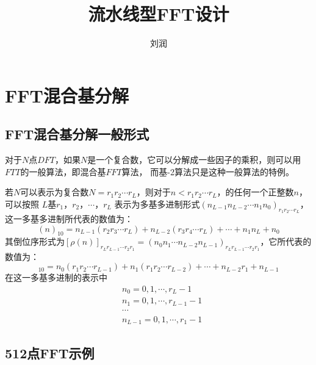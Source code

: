 \documentclass[11pt,a4paper]{article}
\title{流水线型FFT设计}
\author{刘润}
\begin{document}
\maketitle
\section{FFT混合基分解}

\subsection{FFT混合基分解一般形式}
对于$N$点$DFT$，如果$N$是一个复合数，它可以分解成一些因子的乘积，则可以用$FTT$的一般算法，即混合基$FFT$算法，
而基-2算法只是这种一般算法的特例。

若$N$可以表示为复合数$N=r_1r_2 \cdots r_L$，则对于$n<r_1r_2 \cdots r_L$，的任何一个正整数$n$，可以按照
$L$基$r_1$，$r_2$，$\cdots$，$r_L$ 表示为多基多进制形式$(n_{L-1}n_{L-2} \cdots n_1n_0)_{r_1r_2 \cdots r_L}$，
这一多基多进制所代表的数值为：
\begin{equation}
    (n)_{10} = n_{L-1}(r_2r_3 \cdots r_L) + n_{L-2}(r_3r_4 \cdots r_L) + \cdots + n_1n_L + n_0
\end{equation}
其倒位序形式为$[\rho(n)]_{r_Lr_{L-1} \cdots r_2r_1} = (n_0n_1 \cdots n_{L-2}n_{L-1})_{r_Lr_{L-1} \cdots r_2r_1}$，它所代表的数值为：
\begin{equation}
    [\rho(n)]_{10}=n_0(r_1r_2 \cdots r_{L-1}) + n_1(r_1r_2 \cdots r_{L-2}) + \cdots + n_{L-2}r_1 + n_{L-1}
\end{equation}
在这一多基多进制的表示中
\begin{equation}
\begin{aligned}
    &n_0 = 0,1,\cdots ,r_{L}-1 \\
    &n_1 = 0,1,\cdots ,r_{L-1}-1 \\
    &\cdots \\
    &n_{L-1} = 0,1,\cdots ,r_1-1 
\end{aligned}
\end{equation}


\subsection{512点FFT示例}
\end{document}
